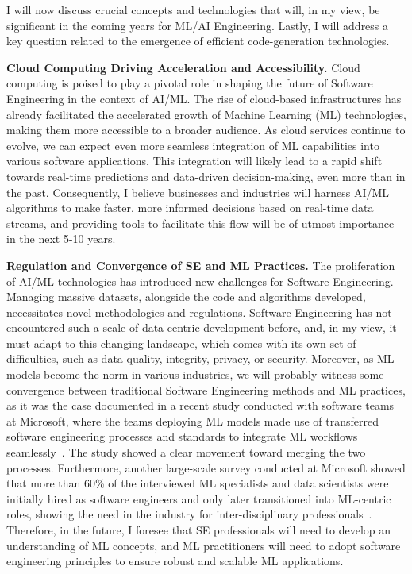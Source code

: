 \documentclass[a4paper, 11pt]{article}
\begin{document}
I will now discuss crucial concepts and technologies that will, in my view, be significant in the coming years for ML/AI Engineering. Lastly, I will address a key question related to the emergence of efficient code-generation technologies.  

\noindent \textbf{Cloud Computing Driving Acceleration and Accessibility.} Cloud computing is poised to play a pivotal role in shaping the future of Software Engineering in the context of AI/ML. The rise of cloud-based infrastructures has already facilitated the accelerated growth of Machine Learning (ML) technologies, making them more accessible to a broader audience. As cloud services continue to evolve, we can expect even more seamless integration of ML capabilities into various software applications. This integration will likely lead to a rapid shift towards real-time predictions and data-driven decision-making, even more than in the past. Consequently, I believe businesses and industries will harness AI/ML algorithms to make faster, more informed decisions based on real-time data streams, and providing tools to facilitate this flow will be of utmost importance in the next 5-10 years.

\noindent \textbf{Regulation and Convergence of SE and ML Practices.} The proliferation of AI/ML technologies has introduced new challenges for Software Engineering. Managing massive datasets, alongside the code and algorithms developed, necessitates novel methodologies and regulations. Software Engineering has not encountered such a scale of data-centric development before, and, in my view, it must adapt to this changing landscape, which comes with its own set of difficulties, such as data quality, integrity, privacy, or security. Moreover, as ML models become the norm in various industries, we will probably witness some convergence between traditional Software Engineering methods and ML practices, as it was the case documented in a recent study conducted with software teams at Microsoft, where the teams deploying ML models made use of transferred software engineering processes and standards to integrate ML workflows seamlessly~\cite{DBLP:conf/icse/AmershiBBDGKNN019}. The study showed a clear movement toward merging the two processes. Furthermore, another large-scale survey conducted at Microsoft showed that more than 60\% of the interviewed ML specialists and data scientists were initially hired as software engineers and only later transitioned into ML-centric roles, showing the need in the industry for inter-disciplinary professionals~\cite{DBLP:journals/tse/KimZDB18}. Therefore, in the future, I foresee that SE professionals will need to develop an understanding of ML concepts, and ML practitioners will need to adopt software engineering principles to ensure robust and scalable ML applications. 
\end{document}
